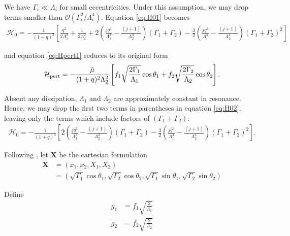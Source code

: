 \documentclass[usenatbib]{mnras}
\renewcommand{\v}[1]{\boldsymbol{ #1 }}
\begin{document}
\noindent We have \(\Gamma_i \ll \Lambda_i\) for small
eccentricities.  Under this assumption, we may drop terms smaller than
\(\mathcal{O}(\Gamma_i^2/\Lambda_i^4)\).  Equation \eqref{eq:H01} becomes
\begin{align}
  \label{eq:H02}
  \mathcal{H}_0
  = -\frac{1}{(1+q)^3}\left[
     \frac{q^3}{2\Lambda_1^2} + \frac{1}{2\Lambda_2^2}
   + 2\left(
     \frac{jq^3}{\Lambda_1^3} - \frac{(j+1)}{\Lambda_2^3}
     \right)(\Gamma_1+\Gamma_2)
   -\frac32\left( 
     \frac{jq^3}{\Lambda_1^4} - \frac{(j+1)}{\Lambda_2^4}\right)
     (\Gamma_1+\Gamma_2)^2
     \right]
\end{align}

\noindent
and equation \eqref{eq:Hpert1} reduces to its original form
\begin{align}
\label{eq:H_3}
  \mathcal{H}_{\rm pert}
  =-\frac{\tilde\mu}{(1+q)^2\Lambda_2^2}
  \left[
  f_1\sqrt{\frac{2\Gamma_1}{\Lambda_1}}\cos\theta_1
  +f_2\sqrt{\frac{2\Gamma_2}{\Lambda_2}}\cos\theta_2
  \right].
\end{align}

\noindent Absent any dissipation, \(\Lambda_1\) and
\(\Lambda_2\) are approximately constant in resonance.  Hence, we may
drop the first two terms in parentheses in equation \eqref{eq:H02},
leaving only the terms which include factors of \((\Gamma_1+\Gamma_2)\):
\begin{align}
  \label{eq:H03}
  \mathcal{H}_0
  = -\frac{1}{(1+q)^3}\left[
   2\left(
     \frac{jq^3}{\Lambda_1^3} - \frac{(j+1)}{\Lambda_2^3}
     \right)(\Gamma_1+\Gamma_2)
   -\frac32\left( 
     \frac{jq^3}{\Lambda_1^4} - \frac{(j+1)}{\Lambda_2^4}\right)
     (\Gamma_1+\Gamma_2)^2
     \right].
\end{align}

Following \cite{henrard86_reduc_trans_apocen_librat}
\citep[or equivalently][]{wisdom_canonical_1986}, let \(\v X\) be the
cartesian formulation
\begin{align}
  \v X &= (x_1, x_2, X_1, X_2)\nonumber\\
  &= (\sqrt{\Gamma_1}\cos\theta_1, \sqrt{\Gamma_2}\cos\theta_2,
    \sqrt{\Gamma_1}\sin\theta_1, \sqrt{\Gamma_2}\sin\theta_2)
\end{align}

\noindent 
Define
\begin{align}
    g_1 &= f_1\sqrt{\frac{2}{\Lambda_1}} \\
    g_2 &= f_2\sqrt{\frac{2}{\Lambda_2}} \\
\end{align}
\end{document}
